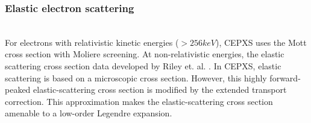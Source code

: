 \subsubsection{Elastic electron scattering}
\\
For electrons with relativistic kinetic energies ($> 256 keV$), CEPXS uses the
Mott cross section with Moliere screening. At non-relativistic energies, the
elastic scattering cross section data developed by Riley et. al. \cite{riley}.
In CEPXS, elastic scattering is based on a microscopic cross section. However,
this highly forward-peaked elastic-scattering cross section is modified by the
extended transport correction. This approximation makes the elastic-scattering
cross section amenable to a low-order Legendre expansion.

